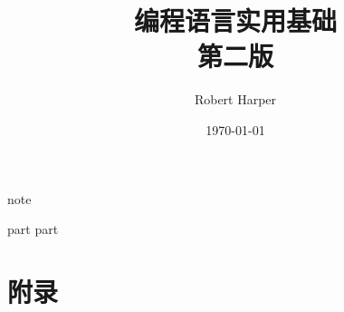 \documentclass{ctexbook}
\title{{\Huge\textbf{编程语言实用基础}} \\第二版}
\author{Robert Harper}
\date{\today}
\begin{document}
\frontmatter
\maketitle

{note}

\setcounter{tocdepth}{1}
\tableofcontents

\newpage
\mainmatter

{part}
{part}

\backmatter
\part{附录}
\appendix
\printglossary[title=术语]
\end{document}
